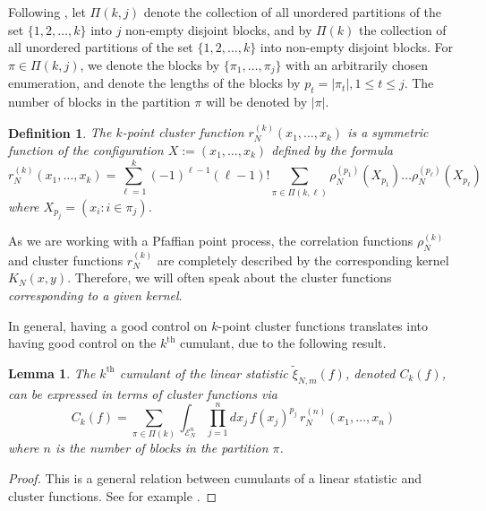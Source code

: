 \documentclass[11pt,reqno]{amsproc}
\newtheorem{lemma}[theorem]{Lemma}
\newtheorem{definition}[theorem]{Definition}
\numberwithin{equation}{section}
\numberwithin{theorem}{section}
\begin{document}
Following \cite{NS12}, let $\Pi(k,j)$ denote the collection of all unordered partitions of the set $\{1,2,\ldots,k\}$ into $j$ non-empty disjoint blocks, and by $\Pi(k)$ the collection of all unordered partitions of the set $\{1,2,\ldots,k\}$ into non-empty disjoint blocks. For $\pi \in \Pi(k,j)$, we denote the blocks by $\{\pi_{1},\ldots,\pi_j\}$ with an arbitrarily chosen enumeration, and denote the lengths of the blocks by $p_t = |\pi_t|, 1 \leq t \leq j$. The number of blocks in the partition $\pi$ will be
denoted by $|\pi|$.

\begin{definition}
\label{def:cluster}
The $k$-point cluster function $r^{(k)}_{N}(x_1,\ldots,x_k)$ is a symmetric function of the configuration $X := (x_1,\ldots,x_k)$ defined by the formula
\begin{equation}
r^{(k)}_{N}(x_1,\ldots,x_k) = \sum_{\ell=1}^{k}(-1)^{\ell-1}(\ell-1)!\sum_{\pi \in \Pi(k,\ell)}\rho^{(p_1)}_{N}(X_{p_1})\ldots \rho^{(p_\ell)}_{N}(X_{p_\ell})
\end{equation}
where $X_{p_j} = (x_{i} : i \in \pi_j)$.
\end{definition}
As we are working with a Pfaffian point process, the correlation functions $\rho^{(k)}_{N}$ and cluster functions $r^{(k)}_{N}$ are completely described by the corresponding kernel $K_{N}(x,y)$. Therefore, we will often speak about the cluster functions \textit{corresponding to a given kernel}.

In general, having a good control on $k$-point cluster functions translates into having good control on the $k^{\mathrm{th}}$ cumulant, due to the following result.
\begin{lemma}
The $k^{\mathrm{th}}$ cumulant of the linear statistic $\tilde{\xi}_{N,m}(f)$, denoted $C_{k}(f)$, can be expressed in terms of cluster functions via
\begin{equation}
C_{k}(f) = \sum_{\pi \in \Pi(k)}\int_{\mathcal{E}_{N}^{n}}\prod_{j=1}^{n}dx_{j}\,f(x_j)^{p_j}\,r^{(n)}_{N}(x_1,\ldots,x_n) \label{cexpr}
\end{equation}
where $n$ is the number of blocks in the partition $\pi$.
\end{lemma}
\begin{proof}
This is a general relation between cumulants of a linear statistic and cluster functions. See for example \cite[Claim 4.3]{NS12}.
\end{proof}
\end{document}
